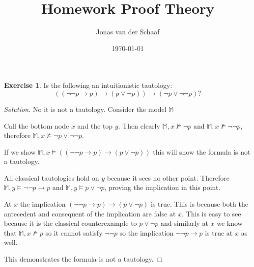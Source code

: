 \documentclass{article}
\title{Homework Proof Theory}
\author{Jonas van der Schaaf}
\date{\today}
\theoremstyle{definition}
\newtheorem{question}{Exercise}
\newenvironment{solution}{\begin{proof}[Solution]\renewcommand{\qedsymbol}{}}{\end{proof}}
\begin{document}
\maketitle

\begin{question}
    Is the following an intuitionistic tautology:
    \[
        ((\neg\neg p\to p)\to (p\vee \neg p))\to (\neg p\vee\neg\neg p)?
    \]

    \begin{solution}
        No it is not a tautology. Consider the model \(\mathbb{M}\)
        \begin{figure}[ht]
            \centering
        \end{figure}
        Call the bottom node \(x\) and the top \(y\). Then clearly
        \(\mathbb{M},x\nvDash\neg p\) and \(\mathbb{M},x\nvDash\neg\neg p\),
        therefore \(\mathbb{M},x\nvDash\neg p\vee\neg\neg p\).

        If we show \(\mathbb{M},x\vDash((\neg\neg p\to p)\to (p\vee \neg p))\)
        this will show the formula is not a tautology.

        All classical tautologies hold on \(y\) because it sees no other point.
        Therefore \(\mathbb{M},y\vDash\neg\neg p\to p\) and \(\mathbb{M},y\vDash
        p\vee\neg p\), proving the implication in this point.

        At \(x\) the implication \((\neg\neg p\to p)\to (p\vee \neg p)\) is
        true. This is because both the antecedent and consequent of the
        implication are false at \(x\). This is easy to see because it is the
        classical counterexample to \(p\vee\neg p\) and similarly at \(x\) we
        know that \(\mathbb{M},x\nvDash p\) so it cannot satisfy \(\neg\neg p\)
        so the implication \(\neg\neg p\to p\) is true at \(x\) as well.

        This demonstrates the formula is not a tautology.
    \end{solution}
\end{question}
\end{document}
